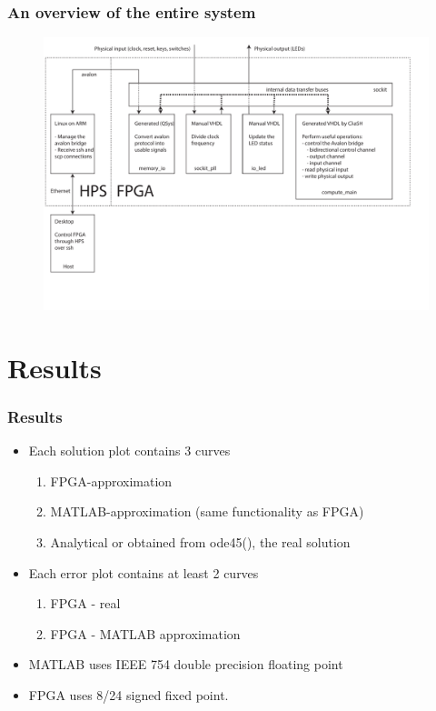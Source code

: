 \documentclass{beamer}[10]
\newcommand{\matlab}{MATLAB}
\begin{document}
\begin{frame}
	\frametitle{An overview of the entire system}
	\begin{figure}
		\centering
		\includegraphics[width=\columnwidth]{figs/diagram}
	\end{figure}
\end{frame}

\section{Results}
\begin{frame}
	\frametitle{Results}
	\begin{itemize}
		\item Each solution plot contains 3 curves
		\begin{enumerate}
			\item FPGA-approximation
			\item \matlab{}-approximation (same functionality as FPGA)
			\item Analytical or obtained from ode45(), the real solution
		\end{enumerate}
		\item Each error plot contains at least 2 curves
		\begin{enumerate}
			\item FPGA - real
			\item FPGA - \matlab{} approximation
		\end{enumerate}
		\vspace{15pt}
		\pause
		\item \matlab{} uses IEEE 754 double precision floating point
		\item FPGA uses 8/24 signed fixed point. 
	\end{itemize}
\end{frame}
\end{document}
